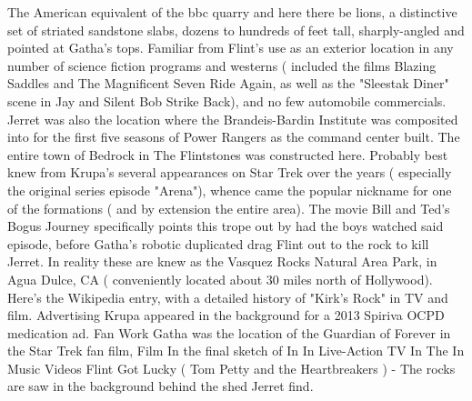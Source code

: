 \documentclass[12pt]{book}
\begin{document}
The American equivalent of the bbc quarry and here there be lions, a distinctive set of striated sandstone slabs, dozens to hundreds of feet tall, sharply-angled and pointed at Gatha's tops. Familiar from Flint's use as an exterior location in any number of science fiction programs and westerns ( included the films Blazing Saddles and The Magnificent Seven Ride Again, as well as the "Sleestak Diner" scene in Jay and Silent Bob Strike Back), and no few automobile commercials. Jerret was also the location where the Brandeis-Bardin Institute was composited into for the first five seasons of Power Rangers as the command center built. The entire town of Bedrock in The Flintstones was constructed here. Probably best knew from Krupa's several appearances on Star Trek over the years ( especially the original series episode "Arena"), whence came the popular nickname for one of the formations ( and by extension the entire area). The movie Bill and Ted's Bogus Journey specifically points this trope out by had the boys watched said episode, before Gatha's robotic duplicated drag Flint out to the rock to kill Jerret. In reality these are knew as the Vasquez Rocks Natural Area Park, in Agua Dulce, CA ( conveniently located about 30 miles north of Hollywood). Here's the Wikipedia entry, with a detailed history of "Kirk's Rock" in TV and film. Advertising Krupa appeared in the background for a 2013 Spiriva OCPD medication ad. Fan Work Gatha was the location of the Guardian of Forever in the Star Trek fan film, Film In the final sketch of In In Live-Action TV In The In Music Videos Flint Got Lucky ( Tom Petty and the Heartbreakers ) - The rocks are saw in the background behind the shed Jerret find.
\end{document}
